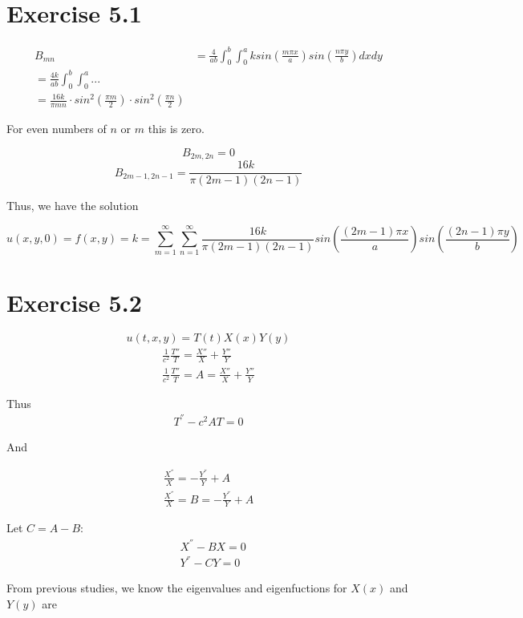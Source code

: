 \documentclass{article}
\begin{document}
\section*{Exercise 5.1}

\begin{align*}
B_{mn} &= \frac{4}{ab} \int_0^b \int_0^a k sin \left( \frac{m\pi x}{a}\right) sin\left( \frac{n \pi y}{b}\right) dx dy\\
= \frac{4k}{ab} \int_0^b \int_0^a ... \\
= \frac{16k}{\pi m n} \cdot sin^2\left(\frac{\pi m}{2}\right) \cdot sin^2\left(\frac{\pi n}{2}\right)
\end{align*}

For even numbers of $n$ or $m$ this is zero.

$$B_{2m,2n} = 0$$
$$B_{2m-1,2n-1} = \frac{16k}{\pi(2m-1)(2n-1)}$$

Thus, we have the solution

$$u(x,y,0) = f(x,y) = k = \sum_{m=1}^{\infty} \sum_{n=1}^{\infty} \frac{16k}{\pi(2m-1)(2n-1)} sin\left(\frac{(2m-1)\pi x}{a}\right)sin\left(\frac{(2n-1)\pi y}{b}\right)$$


\section*{Exercise 5.2}

$$u(t,x,y) = T(t)X(x)Y(y)$$
\begin{align*}
\frac{1}{c^2}\frac{T''}{T}=\frac{X''}{X}+\frac{Y''}{Y} \\
\frac{1}{c^2}\frac{T''}{T}=A= \frac{X''}{X}+\frac{Y''}{Y}
\end{align*}

Thus
\begin{align*}
T^{''}-c^2AT=0
\end{align*}

And

\begin{align*}
\frac{X^{''}}{X} = - \frac{Y^{''}}{Y} + A\\
\frac{X^{''}}{X} = B = - \frac{Y^{''}}{Y} + A
\end{align*}

Let $C = A-B$:
\begin{align*}
&X^{''} - BX=0\\
&Y^{''} - CY=0
\end{align*}

From previous studies, we know the eigenvalues and eigenfuctions for $X(x)$ and $Y(y)$ are
\end{document}
